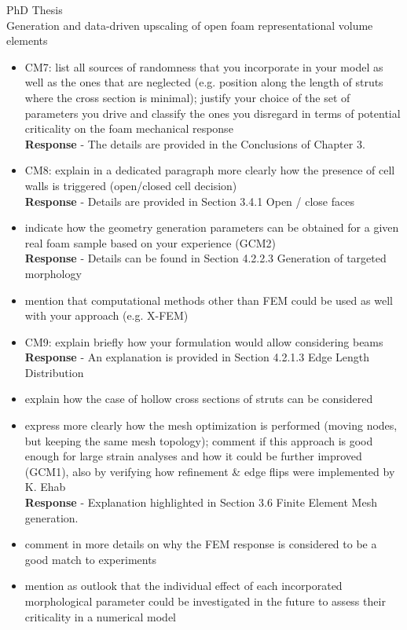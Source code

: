 \documentclass[12pt]{letter}
\begin{document}
\begin{letter}{PhD Thesis\\
Generation and data-driven upscaling of open foam representational volume elements}
\begin{itemize}
\item CM7: list all sources of randomness that you incorporate in your model as well as
the ones that are neglected (e.g. position along the length of struts where the cross
section is minimal); justify your choice of the set of parameters you drive and
classify the ones you disregard in terms of potential criticality on the foam
mechanical response
\\\textbf{Response} - The details are provided in the Conclusions of Chapter 3.

\item CM8: explain in a dedicated paragraph more clearly how the presence of cell walls
is triggered (open/closed cell decision)
\\\textbf{Response} - Details are provided  in Section 3.4.1 Open / close faces

\item indicate how the geometry generation parameters can be obtained for a given real
foam sample based on your experience (GCM2)
\\\textbf{Response} - Details can be found in Section 4.2.2.3 Generation of targeted morphology

\item mention that computational methods other than FEM could be used as well with
your approach (e.g. X-FEM)

\item CM9: explain briefly how your formulation would allow considering beams
\\\textbf{Response} - An explanation is provided in Section 4.2.1.3 Edge Length Distribution

\item explain how the case of hollow cross sections of struts can be considered

\item express more clearly how the mesh optimization is performed (moving nodes, but
keeping the same mesh topology); comment if this approach is good enough for
large strain analyses and how it could be further improved (GCM1), also by
verifying how refinement \& edge flips were implemented by K. Ehab
\\\textbf{Response} - Explanation highlighted in Section 3.6 Finite Element Mesh generation.

\item comment in more details on why the FEM response is considered to be a good
match to experiments

\item mention as outlook that the individual effect of each incorporated morphological
parameter could be investigated in the future to assess their criticality in a numerical
model


\end{itemize}
\end{letter}
\end{document}
